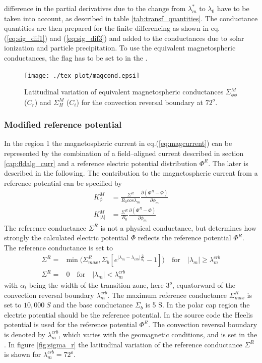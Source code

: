 difference in the partial derivatives due to the change from  $\lambda_m^*$ to  $\lambda_0$ 
have to be taken into account,
as described in table 
\ref{tab:transf_quantities}. The conductance quantities are then
 prepared for the finite differencing as shown in eq. 
(\ref{eq:sig_dif1}) and (\ref{eq:sig_dif3}) and added to the conductances due to solar
ionization and particle precipitation. To use the equivalent magnetospheric
conductances, the flag  has to be set to 
 in the  . 
%
\begin{figure}
  \centering
  \texttt{[image: ./tex\_plot/magcond.epsi]}
  \caption{Latitudinal variation of equivalent magnetospheric conductances 
    $\Sigma_{\phi \phi}^M$ ($C_r$) and $\Sigma_{H}^M$ ($C_i$) for the 
    convection reversal boundary at $72^o$.}
   \label{fig:magcond}
\end{figure}
%
\subsubsection{Modified reference potential}   \label{cap:modrefpot}
%
In the region 1 the magnetospheric current in eq.(\ref{eq:magcurrent}) can be represented
by the combination of a field--aligned current described in 
section \ref{cap:fldalg_curr} and a reference electric potential 
distribution $\Phi^R$. The later is described in
the following. The contribution to the magnetospheric current from a reference potential
can be specified by
%
\begin{align}
  K_{\phi}^M       &=  \frac{\Sigma^R}{R_0 cos
   \lambda_m} \frac{\partial (\Phi^R - \Phi)}{\partial \phi_m} \label{eq:refpotphi}\\
  K_{|\lambda|}^M  &=   \frac{\Sigma^R}{R_0 }
    \frac{\partial (\Phi^R - \Phi) }{\partial \phi_m} \label{eq:refpotlam}
\end{align}
%
The reference conductance $\Sigma^R$ is not a physical conductance, but determines how
strongly the calculated electric potential $\Phi$ reflects the reference potential
$\Phi^R$. The reference conductance is set to
%
\begin{align}
  \Sigma^R =& \text{min} \; \bigl( {\Sigma_{max}^R,\Sigma_b [ e^{|\lambda_m-\lambda_{crb}|
          \frac{2}{\alpha_t}}-1]}  \bigr) \quad \text{for} \quad |\lambda_m|
	   \ge  \lambda_m^{crb} \label{eq:sigmar1}\\ 
  \Sigma^R =& 0 \quad \text{for} \quad |\lambda_m| <  \lambda_m^{crb} \label{eq:sigmar2}
\end{align}
%
with $\alpha_t$ being the width of the transition zone, here $3^o$, equatorward of the
convection reversal boundary $\lambda_m^{crb}$. 
The maximum reference conductance 
$\Sigma_{max}^R$ is set to $10,000 \; S$ and the base conductance $\Sigma_b$ 
is 5 S. In the
polar cap region the electric potential should be the reference potential. In the source
code the Heelis potential is used for the reference
potential $\Phi^R$. The convection reversal boundary is denoted by $\lambda_m^{crb}$, 
which varies with the geomagnetic conditions, and is set in the .
In figure \ref{fig:sigma_r} the latitudinal variation of the
reference conductance $\Sigma^R$ is shown for $\lambda_m^{crb} = 72^o$. 
\\

